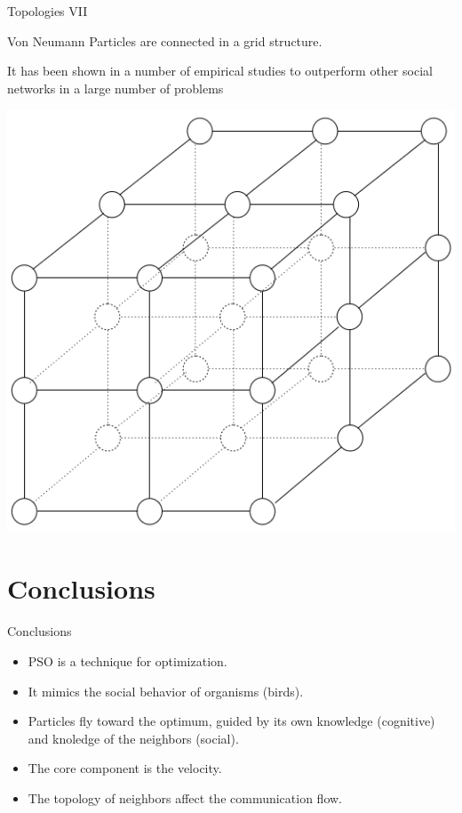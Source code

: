\documentclass[aspectratio=169,compress,10pt]{beamer}
\begin{document}
\begin{frame}{Topologies VII}
\begin{block}{Von Neumann}
Particles are connected in a grid structure. 

It has been shown in a number of empirical studies to outperform other social networks in a large number of problems

\centering
\includegraphics[scale=0.25]{../resources/von-neumann}
\end{block}
\end{frame}

\section{Conclusions}
\begin{frame}{Conclusions}
    \begin{itemize}
    	\item PSO is a technique for optimization.
    	\item It mimics the social behavior of organisms (birds).
    	\item Particles fly toward the optimum, guided by its own knowledge (cognitive) and knoledge of the neighbors (social).
    	\item The core component is the velocity.
    	\item The topology of neighbors affect the communication flow.
    \end{itemize}


\end{frame}
\end{document}
